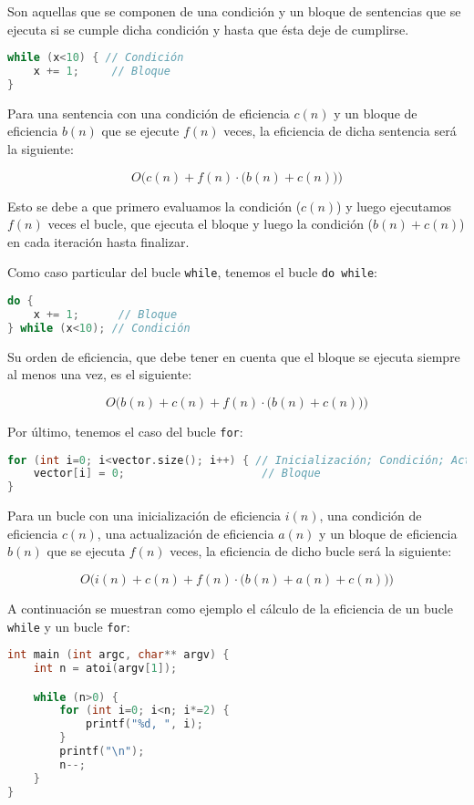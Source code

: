 Son aquellas que se componen de una condición y un bloque de sentencias que se ejecuta si se cumple dicha condición y hasta que ésta deje de cumplirse.

\begin{lstlisting}[language=C]
while (x<10) { // Condición
	x += 1;     // Bloque
}
\end{lstlisting}

Para una sentencia con una condición de eficiencia $c(n)$ y un bloque de eficiencia $b(n)$ que se ejecute $f(n)$ veces, la eficiencia de dicha sentencia será la siguiente:

\[O\Big(c(n)+f(n)\cdot\big(b(n)+c(n)\big)\Big)\]

Esto se debe a que primero evaluamos la condición ($c(n)$) y luego ejecutamos $f(n)$ veces el bucle, que ejecuta el bloque y luego la condición ($b(n)+c(n)$) en cada iteración hasta finalizar.

Como caso particular del bucle \texttt{while}, tenemos el bucle \texttt{do while}:

\begin{lstlisting}[language=C]
do {
	x += 1;      // Bloque
} while (x<10); // Condición
\end{lstlisting}

Su orden de eficiencia, que debe tener en cuenta que el bloque se ejecuta siempre al menos una vez, es el siguiente:

\[O\Big(b(n)+c(n)+f(n)\cdot\big(b(n)+c(n)\big)\Big)\]

Por último, tenemos el caso del bucle \texttt{for}:

\begin{lstlisting}[language=C]
for (int i=0; i<vector.size(); i++) { // Inicialización; Condición; Actualización
	vector[i] = 0;                     // Bloque
}
\end{lstlisting}

Para un bucle con una inicialización de eficiencia $i(n)$, una condición de eficiencia $c(n)$, una actualización de eficiencia $a(n)$ y un bloque de eficiencia $b(n)$ que se ejecuta $f(n)$ veces, la eficiencia de dicho bucle será la siguiente:

\[O\Big(i(n)+c(n)+f(n)\cdot\big(b(n)+a(n)+c(n)\big)\Big)\]

A continuación se muestran como ejemplo el cálculo de la eficiencia de un bucle \texttt{while} y un bucle \texttt{for}:

\begin{lstlisting}[language=C]
int main (int argc, char** argv) {
	int n = atoi(argv[1]);

	while (n>0) {
		for (int i=0; i<n; i*=2) {
			printf("%d, ", i);
		}
		printf("\n");
		n--;
	}
}
\end{lstlisting}

